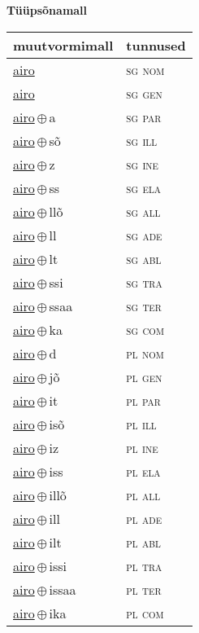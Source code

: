 

\vspace{3.5em}
\noindent \begin{minipage}{\textwidth}
\noindent \textbf{Tüüpsõnamall \,}\\

\begin{sideways}
\begin{tabular}{l l}
muutvormimall & tunnused \\
\hline
\underline{airo} & \textsc{ sg nom } \\
\underline{airo} & \textsc{ sg gen } \\
\underline{airo}\,$\oplus$\,a & \textsc{ sg par } \\
\underline{airo}\,$\oplus$\,sõ & \textsc{ sg ill } \\
\underline{airo}\,$\oplus$\,z & \textsc{ sg ine } \\
\underline{airo}\,$\oplus$\,ss & \textsc{ sg ela } \\
\underline{airo}\,$\oplus$\,llõ & \textsc{ sg all } \\
\underline{airo}\,$\oplus$\,ll & \textsc{ sg ade } \\
\underline{airo}\,$\oplus$\,lt & \textsc{ sg abl } \\
\underline{airo}\,$\oplus$\,ssi & \textsc{ sg tra } \\
\underline{airo}\,$\oplus$\,ssaa & \textsc{ sg ter } \\
\underline{airo}\,$\oplus$\,ka & \textsc{ sg com } \\
\underline{airo}\,$\oplus$\,d & \textsc{ pl nom } \\
\underline{airo}\,$\oplus$\,jõ & \textsc{ pl gen } \\
\underline{airo}\,$\oplus$\,it & \textsc{ pl par } \\
\underline{airo}\,$\oplus$\,isõ & \textsc{ pl ill } \\
\underline{airo}\,$\oplus$\,iz & \textsc{ pl ine } \\
\underline{airo}\,$\oplus$\,iss & \textsc{ pl ela } \\
\underline{airo}\,$\oplus$\,illõ & \textsc{ pl all } \\
\underline{airo}\,$\oplus$\,ill & \textsc{ pl ade } \\
\underline{airo}\,$\oplus$\,ilt & \textsc{ pl abl } \\
\underline{airo}\,$\oplus$\,issi & \textsc{ pl tra } \\
\underline{airo}\,$\oplus$\,issaa & \textsc{ pl ter } \\
\underline{airo}\,$\oplus$\,ika & \textsc{ pl com } \\
\end{tabular}
\end{sideways}
\label{tab:tüüpsõnamall-airo}

\end{minipage}

